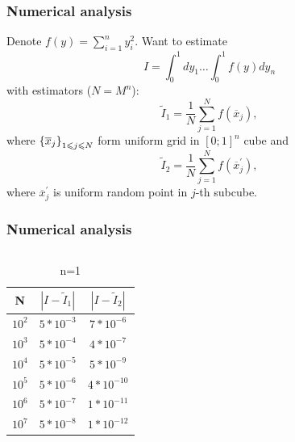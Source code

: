 \documentclass[12pt]{beamer}
\begin{document}
\begin{frame}\frametitle{Numerical analysis}
{\small
Denote $f(y) = \sum_{i=1}^{n} y_i^2$.
Want to estimate
$$I = \int_{0}^1 dy_1\ldots \int_{0}^1 f(y)dy_n$$
with estimators ($N=M^n$):
$$\tilde{I}_1 = \frac{1}{N} \sum_{j=1}^N f(\overline{x}_j),$$
where $\left\{\overline{x}_j\right\}_{1\leqslant j\leqslant N}$ form uniform grid in $[0;1]^n$ cube
and
$$\tilde{I}_2 = \frac{1}{N} \sum_{j=1}^N f(\overline{x}^{'}_j),$$
where $\overline{x}^{'}_j$ is uniform random point in $j$-th subcube.
}
\end{frame}
\begin{frame}\frametitle{Numerical analysis}
{
\footnotesize
\begin{columns}
\begin{column}{5cm}
\begin {table}[h]
\caption{n=1}
\begin{center}
\begin{tabular}{| c | c | c |}
\hline 
N & $|I-\tilde{I}_1 |$ &  $|I-\tilde{I}_2|$\\
\hline
$ 10^2$ & $ 5*10^{-3}$ & $7*10^{-6}$\\
\hline
 $10^3$ &  $5*10^{-4}$ & $4*10^{-7}$\\
\hline
 $10^4$ & $ 5*10^{-5}$ & $5*10^{-9}$\\
\hline
 $10^5 $& $ 5*10^{-6}$ &$ 4*10^{-10}$\\
\hline
 $10^6 $&  $5*10^{-7}$ & $1*10^{-11}$\\
\hline
$10^7$ &  $5*10^{-8} $& $1*10^{-12}$ \\
 \hline
\end{tabular}
\end{center}
\end{table}
\end{column}


\end{columns}}
\end{frame}
\end{document}
